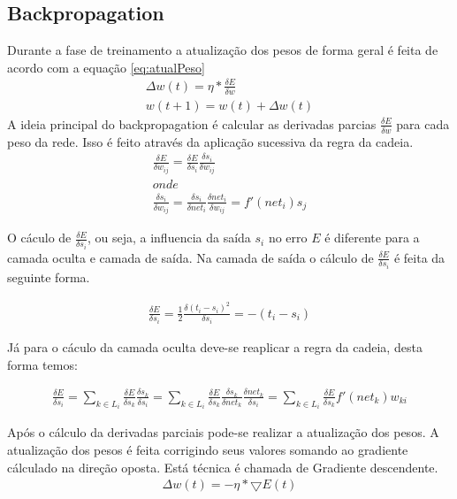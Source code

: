 \documentclass[
	article,			%
	11pt,				%
	oneside,			%
	a4paper,			%
	english,			%
	brazil,				%
	sumario=tradicional
	]{abntex2}
\begin{document}
\subsection{Backpropagation}
Durante a fase de treinamento a atualização dos pesos de forma geral é feita de
acordo com a equação \ref{eq:atualPeso}
\begin{align}
	\Delta w(t)= \eta*\frac{\delta E}{\delta w} \\
	w(t+1)=w(t)+\Delta w(t)
\label{eq:atualPeso}
\end{align}
A ideia principal do backpropagation é calcular as derivadas parcias
$\frac{\delta E}{\delta w}$ para cada peso da rede. Isso é feito através da
aplicação sucessiva da regra da cadeia.
\begin{align}
\frac{\delta E}{\delta w_{ij}}=
\frac{\delta E}{\delta s_i}
\frac{\delta s_i}{\delta w_{ij}}
\\ onde \\
\frac{\delta s_i}{\delta w_{ij}}=
\frac{\delta s_i}{\delta net_i}
\frac{\delta net_i}{\delta w_{ij}}=
f'(net_i)s_j
\end{align}

O cáculo de $\frac{\delta E}{\delta s_i}$, ou seja, a influencia da saída
$s_i$ no erro $E$ é diferente para a camada oculta e camada de saída.
Na camada de saída o cálculo de $\frac{\delta E}{\delta s_i}$ é feita da
seguinte forma.

\begin{align}
\frac{\delta E}{\delta s_i}=
\frac{1}{2}\frac{\delta (t_i-s_i)^2}{\delta s_i}=-(t_i-s_i)
\end{align}

Já para o cáculo da camada oculta deve-se reaplicar a regra da cadeia, desta
forma temos:

\begin{align}
\frac{\delta E}{\delta s_i}=
\sum_{k \in L_i} \frac{\delta E}{\delta s_k} \frac{\delta s_k}{\delta s_i}=
\sum_{k \in L_i} \frac{\delta E}{\delta s_k} \frac{\delta s_k}{\delta net_k}
\frac{\delta net_k}{\delta s_i}=
\sum_{k \in L_i} \frac{\delta E}{\delta s_k} f'(net_k)w_{ki}
\end{align}

Após o cálculo da derivadas parciais pode-se realizar a atualização dos pesos. A
atualização dos pesos é feita corrigindo seus valores somando ao gradiente
cálculado na direção oposta. Está técnica é chamada de Gradiente descendente.
\begin{align}
\Delta w(t)=-\eta * \bigtriangledown E(t)
\end{align}
\end{document}
